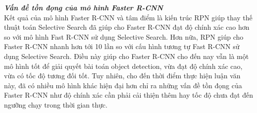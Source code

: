 {    %


    \noindent
    \textbf{\textit{Vấn đề tồn đọng của mô hình Faster R-CNN}} \\
    Kết quả của mô hình Faster R-CNN và tâm điểm là kiến trúc RPN giúp thay thế thuật toán Selective Search đã giúp cho Faster R-CNN đạt độ chính xác cao hơn so với mô hình Fast R-CNN sử dụng Selective Search.
    Hơn nữa, RPN giúp cho Faster R-CNN nhanh hơn tới 10 lần so với cấu hình tương tự Fast R-CNN sử dụng Selective Search.
    Điều này giúp cho Faster R-CNN cho đến nay vẫn là một mô hình tốt để giải quyết bài toán object detection, vừa đạt độ chính xác cao, vừa có tốc độ tương đối tốt.
    Tuy nhiên, cho đến thời điểm thực hiện luận văn này, đã có nhiều mô hình khác hiện đại hơn chỉ ra những vấn đề tồn đọng của Faster R-CNN như độ chính xác cần phải cải thiện thêm hay tốc độ chưa đạt đến ngưỡng chạy trong thời gian thực. 
}